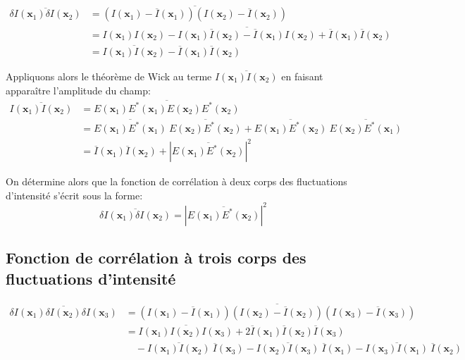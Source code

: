 \begin{align}
\overline{\delta I (\mathbf{x}_1) \delta I(\mathbf{x}_2)} &= \overline{(I(\mathbf{x}_1)-\overline{I}(\mathbf{x}_1)) (I(\mathbf{x}_2)-\overline{I}(\mathbf{x}_2))} \\
&= \overline{I(\mathbf{x}_1)I(\mathbf{x}_2) - I(\mathbf{x}_1) \overline{I}(\mathbf{x}_2) - \overline{I}(\mathbf{x}_1) I(\mathbf{x}_2) + \overline{I}(\mathbf{x}_1) \overline{I}(\mathbf{x}_2)} \\
&=\overline{I(\mathbf{x}_1)I(\mathbf{x}_2)} - \overline{I}(\mathbf{x}_1) \overline{I}(\mathbf{x}_2)
\end{align}

Appliquons alors le théorème de Wick au terme $\overline{I(\mathbf{x}_1)I(\mathbf{x}_2)}$ en faisant apparaître l'amplitude du champ:
\begin{align}
\overline{I(\mathbf{x}_1)I(\mathbf{x}_2)} &= \overline{E(\mathbf{x}_1)E^*(\mathbf{x}_1)E(\mathbf{x}_2)E^*(\mathbf{x}_2)} \\
&= \overline{E(\mathbf{x}_1)E^*(\mathbf{x}_1)} \: \overline{E(\mathbf{x}_2)E^*(\mathbf{x}_2)} + \overline{E(\mathbf{x}_1)E^*(\mathbf{x}_2)} \: \overline{E(\mathbf{x}_2)E^*(\mathbf{x}_1)} \\
&= \overline{I}(\mathbf{x}_1) \overline{I}(\mathbf{x}_2) + \left| \overline{E(\mathbf{x}_1) E^*(\mathbf{x}_2)} \right|^2
\end{align}

On détermine alors que la fonction de corrélation à deux corps des fluctuations d'intensité s'écrit sous la forme:
\begin{equation}
\overline{\delta I(\mathbf{x}_1) \delta I(\mathbf{x}_2)} = \left| \overline{E(\mathbf{x}_1) E^*(\mathbf{x}_2)} \right|^2
\end{equation}


\subsection{Fonction de corrélation à trois corps des fluctuations d'intensité}


\begin{align}
\overline{\delta I(\mathbf{x}_1) \delta I(\mathbf{x}_2) \delta I(\mathbf{x}_3)} &= \overline{(I(\mathbf{x}_1)-\overline{I}(\mathbf{x}_1))(I(\mathbf{x}_2)-\overline{I}(\mathbf{x}_2))(I(\mathbf{x}_3)-\overline{I}(\mathbf{x}_3))} \\
&= \overline{I(\mathbf{x}_1)I(\mathbf{x}_2)I(\mathbf{x}_3)} +2 \overline{I}(\mathbf{x}_1)\overline{I}(\mathbf{x}_2)\overline{I}(\mathbf{x}_3) \\
\nonumber & \quad - \overline{I(\mathbf{x}_1)I(\mathbf{x}_2)}\:\overline{I}(\mathbf{x}_3) - \overline{I(\mathbf{x}_2)I(\mathbf{x}_3)}\:\overline{I}(\mathbf{x}_1)- \overline{I(\mathbf{x}_3)I(\mathbf{x}_1)}\:\overline{I}(\mathbf{x}_2) 
\end{align}

